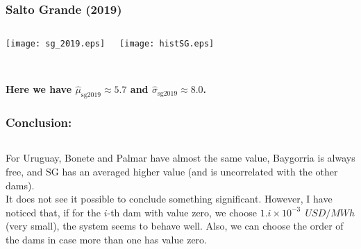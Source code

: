\documentclass[aspectratio=169]{beamer}
\begin{document}
\begin{frame}\frametitle{Salto Grande (2019)}
\begin{columns}[c]

\texttt{[image: sg\_2019.eps]}

\texttt{[image: histSG.eps]}

\end{columns}
\quad\\
\textbf{Here we have $\hat{\mu}_{\text{sg2019}}\approx5.7$ and $\hat{\sigma}_{\text{sg2019}}\approx8.0$.}

\end{frame}


\begin{frame}\frametitle{Conclusion:}
\begin{columns}[c]



\end{columns}
For Uruguay, Bonete and Palmar have almost the same value, Baygorria is always free, and SG has an averaged higher value (and is uncorrelated with the other dams).\\
It does not see it possible to conclude something significant. However, I have noticed that, if for the $i$-th dam with value zero, we choose $1.i\times10^{-3}\ \SI{}{USD/MWh}$ (very small), the system seems to behave well. Also, we can choose the order of the dams in case more than one has value zero.
\end{frame}
\end{document}
